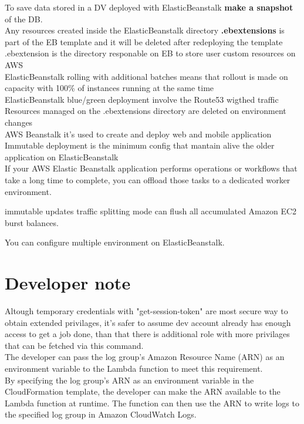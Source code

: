 \documentclass[12pt, letterpaper, twoside]{article}
\begin{document}
To save data stored in a DV deployed with ElasticBeanstalk \textbf{make a snapshot} of the DB.\\

Any resources created inside the ElasticBeanstalk directory \textbf{.ebextensions} is part of
the EB template and it will be deleted after redeploying the template\\

.ebextension is the directory responable on EB to store user custom resources on AWS\\

ElasticBeanstalk  rolling with additional batches means that rollout is made on capacity with 100\%
of instances running at the same time\\
ElasticBeanstalk blue/green deployment involve the Route53 wigthed traffic\\
Resources managed on the .ebextensions directory are deleted on environment changes\\

AWS Beanstalk it's used to create and deploy web and mobile application\\

Immutable deployment is the minimum config that mantain alive the older application on ElasticBeanstalk\\

If your AWS Elastic Beanstalk application performs operations or workflows that take a long time to complete, 
you can offload those tasks to a dedicated worker environment. 

immutable updates traffic splitting mode can flush all accumulated Amazon EC2 burst balances.

You can configure multiple environment on ElasticBeanstalk.\\


\section{Developer note}
Altough temporary credentials with "get-session-token" are most secure way to obtain extended 
privilages, it's safer to assume dev account already has enough access to get a job done, than 
that there is additional role with more privilages that can be fetched via this command.\\

The developer can pass the log group's Amazon Resource Name (ARN) as an environment variable 
to the Lambda function to meet this requirement.\\
By specifying the log group's ARN as an environment variable in the CloudFormation template, 
the developer can make the ARN available to the Lambda function at runtime. The function can then
use the ARN to write logs to the specified log group in Amazon CloudWatch Logs.\\
\end{document}
